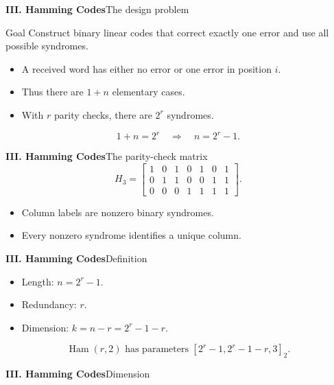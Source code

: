 \begin{frame}{\textbf{III. Hamming Codes}}{The design problem}
\small
\begin{block}{Goal}
Construct binary linear codes that correct exactly one error and use all possible syndromes.
\end{block}
\begin{itemize}
  \item A received word has either no error or one error in position $i$.
  \item Thus there are $1+n$ elementary cases.
  \item With $r$ parity checks, there are $2^r$ syndromes.
\end{itemize}
\[
  1+n=2^r
  \quad\Rightarrow\quad
  n=2^r-1.
\]
\end{frame}

\begin{frame}{\textbf{III. Hamming Codes}}{The parity-check matrix}
\small
{}
\[
  H_3=
  \begin{bmatrix}
  1&0&1&0&1&0&1\\
  0&1&1&0&0&1&1\\
  0&0&0&1&1&1&1
  \end{bmatrix}.
\]
\begin{itemize}
  \item Column labels are nonzero binary syndromes.
  \item Every nonzero syndrome identifies a unique column.
\end{itemize}
\end{frame}

\begin{frame}{\textbf{III. Hamming Codes}}{Definition}
\small
{}
\begin{itemize}
  \item Length: $n=2^r-1$.
  \item Redundancy: $r$.
  \item Dimension: $k=n-r=2^r-1-r$.
\end{itemize}
\[
  \operatorname{Ham}(r,2)\text{ has parameters }[2^r-1,2^r-1-r,3]_2.
\]
\end{frame}

\begin{frame}{\textbf{III. Hamming Codes}}{Dimension}
\small
{}
\end{frame}

